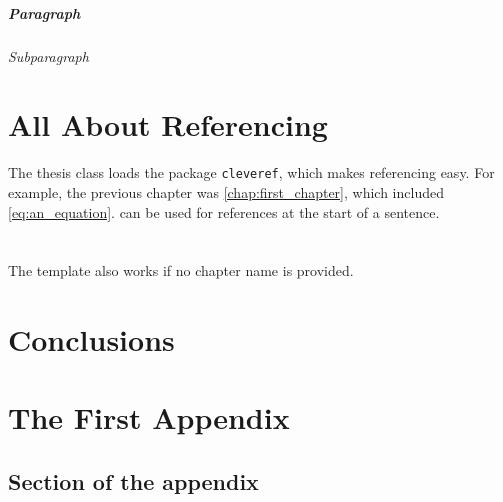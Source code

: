 \documentclass{thesis}
\begin{document}
\paragraph{Paragraph} 
\lipsum[16][1-5]
\subparagraph{Subparagraph} 
\lipsum[17][1-5]


\chapter{All About Referencing}

The thesis class loads the package \texttt{cleveref}, which makes referencing easy. For example, the previous chapter was \cref{chap:first_chapter}, which included \eqref{eq:an_equation}.  can be used for references at the start of a sentence.


\chapter{}

The template also works if no chapter name is provided.


{
\backmatter
\chapter{Conclusions}
\lipsum[22-26]
\printbibliography[heading=bibintoc,title={References}]
}


\appendix
\chapter{The First Appendix}
\lipsum[18]
\section{Section of the appendix}
\lipsum[19-21]

\end{document}
